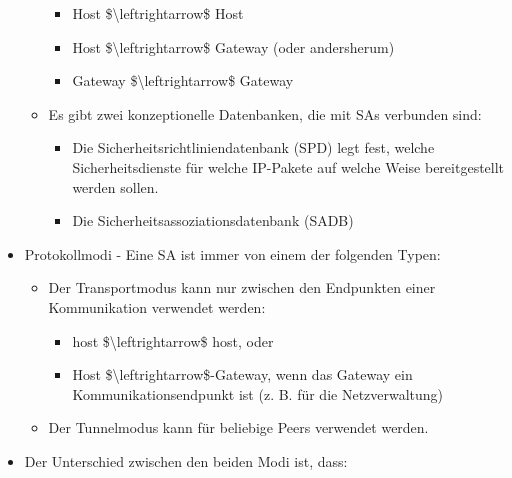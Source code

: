\documentclass[a4paper]{article}
\begin{document}
\begin{multicols}{3}
\begin{itemize}
\begin{itemize}
                        \begin{itemize}
                            \item
                                  Host \$\textbackslash leftrightarrow\$ Host
                            \item
                                  Host \$\textbackslash leftrightarrow\$ Gateway (oder andersherum)
                            \item
                                  Gateway \$\textbackslash leftrightarrow\$ Gateway
                        \end{itemize}
                  \item
                        Es gibt zwei konzeptionelle Datenbanken, die mit SAs verbunden sind:

                        \begin{itemize}
                            \item
                                  Die Sicherheitsrichtliniendatenbank (SPD) legt fest, welche
                                  Sicherheitsdienste für welche IP-Pakete auf welche Weise
                                  bereitgestellt werden sollen.
                            \item
                                  Die Sicherheitsassoziationsdatenbank (SADB)
                        \end{itemize}
              \end{itemize}
        \item
              Protokollmodi - Eine SA ist immer von einem der folgenden Typen:

              \begin{itemize}
                  \item
                        Der Transportmodus kann nur zwischen den Endpunkten einer
                        Kommunikation verwendet werden:

                        \begin{itemize}
                            \item
                                  host \$\textbackslash leftrightarrow\$ host, oder
                            \item
                                  Host \$\textbackslash leftrightarrow\$-Gateway, wenn das Gateway
                                  ein Kommunikationsendpunkt ist (z. B. für die Netzverwaltung)
                        \end{itemize}
                  \item
                        Der Tunnelmodus kann für beliebige Peers verwendet werden.
              \end{itemize}
        \item
              Der Unterschied zwischen den beiden Modi ist, dass:


\end{itemize}
\end{multicols}
\end{document}
